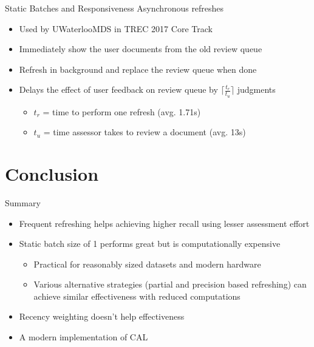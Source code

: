 \documentclass[14pt]{beamer}
\begin{document}
\begin{frame}{Static Batches and Responsiveness}
    Asynchronous refreshes
    \begin{itemize}
        \item Used by UWaterlooMDS in TREC 2017 Core
            Track~\cite{zhang2017uwaterloomds}
        \item Immediately show the user documents from the old review queue
        \item Refresh in background and replace the review queue when done
            \pause
        \item Delays the effect of user feedback on review queue by
            $\lceil \frac{t_r}{t_u} \rceil$ judgments
            \begin{itemize}
                \item $t_r$ = time to perform one refresh (avg. 1.71s)
                \item $t_u$ = time assessor takes to review a document (avg. 13s)
            \end{itemize}
    \end{itemize}
\end{frame}



\section{Conclusion}
\begin{frame}{Summary}
\begin{itemize}
    \item Frequent refreshing helps achieving higher recall using lesser
       assessment effort
       \vskip 0.5cm
    \item Static batch size of 1 performs great but is computationally expensive
        \begin{itemize}
            \item Practical for reasonably sized datasets and modern hardware
            \item Various alternative strategies (partial and precision based
                refreshing) can achieve similar effectiveness with reduced
                computations
        \end{itemize}
    \item Recency weighting doesn't help effectiveness
    \item A modern implementation of CAL
\end{itemize}
\end{frame}
\end{document}
